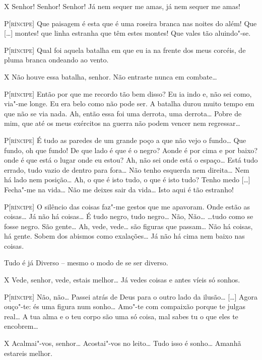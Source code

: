 \textsc{X} Senhor! Senhor! Senhor! Já nem sequer me amas, já nem sequer me
amas!

\textsc{P[ríncipe]} Que paisagem é esta que é uma roseira branca nas noites
do além! Que [\ldots{}] montes! que linha estranha que têm estes montes!
Que vales tão aluindo"-se.

\textsc{P[ríncipe]} Qual foi aquela batalha em que eu ia na frente dos meus
corcéis, de pluma branca ondeando ao vento.

\textsc{X} Não houve essa batalha, senhor. Não entraste nunca em combate\ldots{}

\textsc{P[ríncipe]} Então por que me recordo tão bem disso? Eu ia indo e, não
sei como, via"-me longe. Eu era belo como não pode ser. A batalha
durou muito tempo em que não se via nada. Ah, então essa foi uma
derrota, uma derrota\ldots{} Pobre de mim, que até os meus exércitos na
guerra não podem vencer nem regressar\ldots{}

\textsc{P[ríncipe]} É tudo as paredes de um grande poço a que não vejo o
fundo\ldots{} Que fundo, oh que fundo! De que lado é que é o negro? Aonde
é por cima e por baixo? onde é que está o lugar onde eu estou? Ah,
não sei onde está o espaço\ldots{} Está tudo errado, tudo vazio de dentro
para fora\ldots{} Não tenho esquerda nem direita\ldots{} Nem há lado nem
posição\ldots{} Ah, o que é isto tudo, o que é isto tudo? Tenho medo [\ldots{}]
Fecha"-me na vida\ldots{} Não me deixes sair da vida\ldots{} Isto aqui é tão
estranho!

\textsc{P[ríncipe]} O silêncio das coisas faz"-me gestos que me apavoram. Onde
estão as coisas\ldots{} Já não há coisas\ldots{} É tudo negro, tudo negro\ldots{} Não,
Não\ldots{} \ldots{}tudo como se fosse negro. São gente\ldots{} Ah, vede, vede\ldots{} são
figuras que passam\ldots{} Não há coisas, há gente. Sobem dos abismos como
exalações\ldots{} Já não há cima nem baixo nas coisas.

Tudo é já Diverso -- mesmo o modo de se ser diverso.

\textsc{X} Vede, senhor, vede, estais melhor\ldots{} Já vedes coisas e antes víeis
só sonhos.

\textsc{P[ríncipe]} Não, não\ldots{} Passei atrás de Deus para o outro lado da
ilusão\ldots{} [\ldots{}] Agora ouço"-te: és uma figura num sonho\ldots{} Amo"-te com
compaixão porque te julgas real\ldots{} A tua alma e o teu corpo são uma
só coisa, mal sabes tu o que eles te encobrem\ldots{}

\textsc{X} Acalmai"-vos, senhor\ldots{} Acostai"-vos no leito\ldots{} Tudo isso é
sonho\ldots{} Amanhã estareis melhor.

